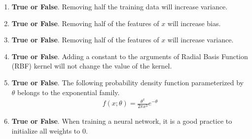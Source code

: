 \documentclass{article}
\newif\ifsolutions
\newenvironment{labelledanswer}{{\bf Answer:} \sf }{}%
\newcommand{\answer}[2]
{{
\ifsolutions
\begin{labelledanswer}
\color{red} 
#2
\end{labelledanswer}
\else
#1
\fi
}}
\begin{document}
\begin{enumerate}

\item \textbf{True or False}. Removing half the training data will increase variance.

\answer{}{True, this should mean that the model will have less to work with for prediction. The test prediction will likely be larger than before, indicating incrase variance.}

\item \textbf{True or False}. Removing half of the features of $x$ will increase bias.

\answer{}{True, this would increase bias since it forces the model to assume more with less information available.}

\item \textbf{True or False}. Removing half of the features of $x$ will increase variance.

\answer{}{False, removing features leads to increase in bias, which could lead to decrease in variance. }

\item \textbf{True or False}. Adding a constant to the arguments of Radial Basis Function (RBF) kernel will not change the value of the kernel.

\answer{}{True, since RBF kernels rely on calculating squared distance. This squared distance would be unchanged as $((x+c) - (x'+c))^2 = ((x - x')^2 $.}

\item \textbf{True or False}. The following probability density function parameterized by $\theta$ belongs to the exponential family.
\begin{align}
f(x;\theta) = \frac{\theta^x}{2\pi x^3}e^{-\theta}
\end{align}

\answer{}{True, we can derive the parameters:
$$
f(x;\theta) = \frac{\theta^x}{2\pi x^3}e^{-\theta} = \frac{1}{2\pi x^3} (\theta^x \; e^{-\theta})
$$
$$
= \frac{1}{2\pi x^3} \exp(\log(\theta^x \; e^{-\theta}))
$$
$$
= \frac{1}{2\pi x^3} \exp(\log(\theta^x) + \log(e^{-\theta}))
$$
$$
= \frac{1}{2\pi x^3} \exp(x\log(\theta) -\theta)
$$
Rewrite this with y instead of x:
$$
f(y;\theta) = \frac{1}{2\pi y^3} \exp(y\log(\theta) -\theta)
$$
The parameters:
$$
b(y) = \frac{1}{2\pi y^3}; \; T(y)= y; \; 
$$
$$
\eta^T=\log(\theta) \implies \eta = \log(\theta) \implies \theta = e^\eta
$$
$$
\alpha(\eta)= \theta = e^\eta
$$
}

\item \textbf{True or False}. When training a neural network, it is a good practice to initialize all weights to $0$.


\end{enumerate}
\end{document}
